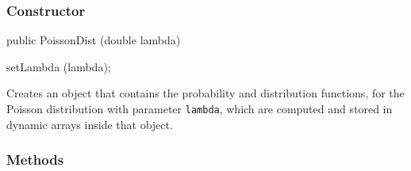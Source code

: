\subsubsection* {Constructor}
\begin{code}

   public PoissonDist (double lambda)\begin{hide} {
      setLambda (lambda);
   }\end{hide}
\end{code}
  \begin{tabb}
   Creates an object that contains
   the probability and distribution functions, for the Poisson
   distribution with parameter \texttt{lambda}, which are
   computed and stored in dynamic arrays inside that object.
 \end{tabb}

\subsubsection* {Methods}

